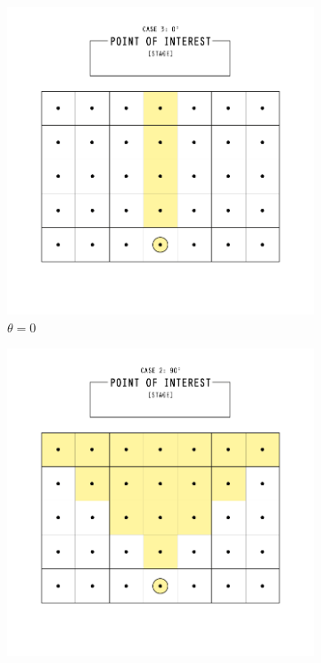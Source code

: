 \begin{figure}[h]
  \centering
  \begin{subfigure}[b]{0.3\linewidth}
    \includegraphics[width=\linewidth]{images/chapter4/0degD.png}
    \caption{$\theta = 0$}
  \end{subfigure}
  \begin{subfigure}[b]{0.3\linewidth}
    \includegraphics[width=\linewidth]{images/chapter4/90degD.png}

\end{subfigure}
\end{figure}
